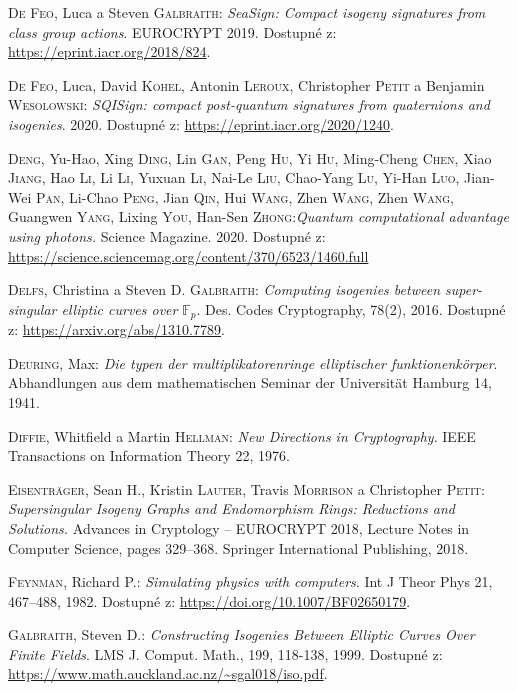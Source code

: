 \documentclass[12pt]{report}
\begin{document}
\begin{thebibliography}{97}
\textsc{De Feo}, Luca a Steven \textsc{Galbraith}: \textit{SeaSign: Compact isogeny signatures from class group actions}. EUROCRYPT 2019. Dostupné z: \url{https://eprint.iacr.org/2018/824}.

\textsc{De Feo}, Luca, David \textsc{Kohel}, Antonin \textsc{Leroux}, Christopher \textsc{Petit} a Benjamin \textsc{Wesolowski}: \textit{SQISign: compact post-quantum signatures from quaternions and isogenies}. 2020. Dostupné z: \url{https://eprint.iacr.org/2020/1240}.

\textsc{Deng}, Yu-Hao, Xing \textsc{Ding}, Lin \textsc{Gan}, Peng \textsc{Hu}, Yi \textsc{Hu}, Ming-Cheng \textsc{Chen}, Xiao \textsc{Jiang}, Hao \textsc{Li}, Li \textsc{Li}, Yuxuan \textsc{Li}, Nai-Le \textsc{Liu}, Chao-Yang \textsc{Lu}, Yi-Han \textsc{Luo}, Jian-Wei \textsc{Pan}, Li-Chao \textsc{Peng}, Jian \textsc{Qin}, Hui \textsc{Wang}, Zhen \textsc{Wang}, Zhen \textsc{Wang}, Guangwen \textsc{Yang}, Lixing \textsc{You}, Han-Sen \textsc{Zhong}:\textit{Quantum computational advantage using photons.} Science Magazine. 2020. Dostupné z: \url{https://science.sciencemag.org/content/370/6523/1460.full}

\textsc{Delfs}, Christina a Steven D. \textsc{Galbraith}: \textit{Computing isogenies between super-singular elliptic curves over} $\mathbb{F}_p$. Des. Codes Cryptography, 78(2), 2016. Dostupné z: \url{https://arxiv.org/abs/1310.7789}.

\textsc{Deuring}, Max: \textit{Die typen der multiplikatorenringe elliptischer funktionenkörper}. Abhandlungen aus dem mathematischen Seminar der Universität Hamburg 14, 1941. 

\textsc{Diffie}, Whitfield a Martin \textsc{Hellman}: \textit{New Directions in Cryptography}. IEEE Transactions on Information Theory 22, 1976.

\textsc{Eisentr{\"a}ger}, Sean H., Kristin \textsc{Lauter}, Travis \textsc{Morrison} a Christopher \textsc{Petit}: \textit{Supersingular Isogeny Graphs and Endomorphism Rings: Reductions and Solutions.}
Advances in Cryptology – EUROCRYPT 2018, Lecture Notes in Computer Science, pages 329–368. Springer International Publishing, 2018.

\textsc{Feynman}, Richard P.: \textit{Simulating physics with computers}. Int J Theor Phys 21, 467–488, 1982. Dostupné z: \url{https://doi.org/10.1007/BF02650179}.

\textsc{Galbraith}, Steven D.: \textit{Constructing Isogenies Between Elliptic Curves Over Finite Fields}. LMS J. Comput. Math., 199, 118-138, 1999. Dostupné z: \url{https://www.math.auckland.ac.nz/~sgal018/iso.pdf}.


\end{thebibliography}
\end{document}
